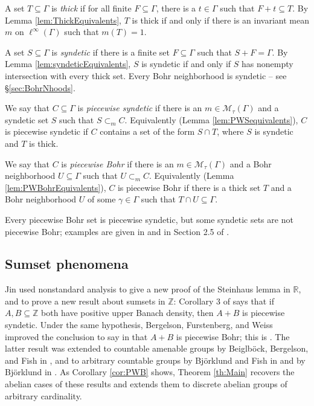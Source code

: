 \documentclass[12pt]{amsart} \usepackage{amsmath,centernot,amssymb,leftindex}
\numberwithin{theorem}{section}
\numberwithin{equation}{section}
\theoremstyle{definition}
\begin{document}
	A set $T\subseteq \Gamma$ is \emph{thick} if for all finite $F\subseteq \Gamma$, there is a $t\in \Gamma$ such that $F+t\subseteq T$.   By Lemma \ref{lem:ThickEquivalents}, $T$ is thick if and only if there is an invariant mean $m$ on $\ell^{\infty}(\Gamma)$ such that $m(T)=1$.
	
	A set $S\subseteq \Gamma$ is \emph{syndetic} if there is a finite set $F\subseteq \Gamma$ such that $S+F=\Gamma$. By Lemma \ref{lem:syndeticEquivalents}, $S$ is syndetic if and only if $S$ has nonempty intersection with every thick set.  Every Bohr neighborhood is syndetic -- see \S\ref{sec:BohrNhoods}.
	
	We say that $C\subseteq \Gamma$ is \emph{piecewise syndetic} if there is an $m\in \mathcal M_{\tau}(\Gamma)$ and a syndetic set $S$ such that $S\subset_{m} C$.  Equivalently (Lemma \ref{lem:PWSequivalents}),  $C$ is piecewise syndetic if $C$ contains a set of the form $S\cap T$, where $S$ is syndetic and $T$ is thick. 
	
	We say that $C$ is \emph{piecewise Bohr} if there is an $m\in \mathcal M_{\tau}(\Gamma)$ and a Bohr neighborhood $U\subseteq \Gamma$ such that $U\subset_{m}C$.  Equivalently (Lemma \ref{lem:PWBohrEquivalents}), $C$ is piecewise Bohr if there is a thick set $T$ and a Bohr neighborhood $U$ of some $\gamma\in \Gamma$ such that $T\cap U\subseteq \Gamma$.
	
	Every piecewise Bohr set is piecewise syndetic, but some syndetic sets are not piecewise Bohr;
	examples are given in \cite[Theorem 4.3]{BergelsonFurstenbergWeiss} and in Section 2.5 of \cite{Griesmer_SumsetsDenseSparse}.

	
	
	\subsection{Sumset phenomena}\label{sec:SumsetPhenomena}	  Jin \cite{Jin_SumsetPhenom} used nonstandard analysis to give a new proof of the Steinhaus lemma in $\mathbb R$, and to prove a new result about sumsets in $\mathbb Z$: Corollary 3 of \cite{Jin_SumsetPhenom} says that if $A, B\subseteq \mathbb Z$ both have positive upper Banach density, then $A+B$ is piecewise syndetic.  Under the same hypothesis, Bergelson, Furstenberg, and Weiss  improved the conclusion to say in  that $A+B$ is piecewise Bohr; this is  \cite[Theorem I]{BergelsonFurstenbergWeiss}.  The latter result was extended to countable amenable groups by Beiglb\"ock, Bergelson, and Fish in \cite{BeiglbockBergelsonFish}, and to arbitrary countable groups by Bj\"orklund and Fish in \cite{BjorklundFish_ProductSet} and by Bj\"orklund in \cite{Bjorklund_ProductSetMeasured}.   As Corollary \ref{cor:PWB} shows, Theorem \ref{th:Main}  recovers the abelian cases of these results and extends them to discrete abelian groups of arbitrary cardinality.   
	
\end{document}
